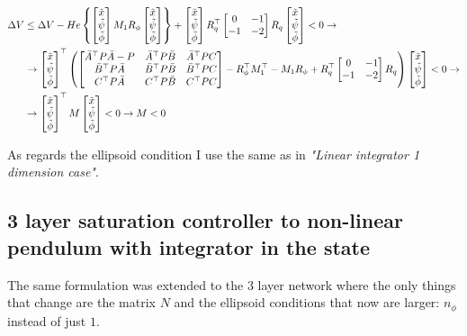 \documentclass{article}
\begin{document}
\begin{align} \label{V-condition}
  \Delta V &\leq \Delta V - He \left\{\left[\begin{matrix}
    \tilde{x} \\
    \tilde{\psi} \\
    \tilde{\phi}
  \end{matrix}\right] M_{1} R_{\phi} \left[\begin{matrix}
    \tilde{x} \\
    \tilde{\psi} \\
    \tilde{\phi}
  \end{matrix}\right]\right\} + \left[\begin{matrix}
    \tilde{x} \\
    \tilde{\psi} \\
    \tilde{\phi}
  \end{matrix}\right] R_{q}^\top \left[\begin{matrix}
    0 & -1 \\
    -1 & -2
  \end{matrix}\right] R_{q} \left[\begin{matrix}
    \tilde{x} \\
    \tilde{\psi} \\
    \tilde{\phi}
  \end{matrix}\right] < 0 \to \\
  & \to \left[\begin{matrix}
    \tilde{x} \\
    \tilde{\psi} \\
    \tilde{\phi}
  \end{matrix}\right]^\top
  \left( \left[\begin{matrix}
    \bar{A}^\top P \bar{A} - P & \bar{A}^\top P \bar{B} & \bar{A}^\top P C \\
    \bar{B}^\top P \bar{A} & \bar{B}^\top P \bar{B} & \bar{B}^\top P C \\
    C^\top P \bar{A} & C^\top P \bar{B} & C^\top P C
  \end{matrix}\right] - R_{\phi} ^\top M_{1}^\top - M_{1} R_{\phi} + R_{q}^\top \left[\begin{matrix}
    0 & -1 \\
    -1 & -2
  \end{matrix}\right] R_{q}\right)
  \left[\begin{matrix}
    \tilde{x} \\
    \tilde{\psi} \\
    \tilde{\phi}
  \end{matrix}\right] < 0 \to \\
  & \to \left[\begin{matrix}
    \tilde{x} \\
    \tilde{\psi} \\
    \tilde{\phi}
  \end{matrix}\right]^\top
  M
  \left[\begin{matrix}
    \tilde{x} \\
    \tilde{\psi} \\
    \tilde{\phi}
  \end{matrix}\right] < 0 \to M < 0 
\end{align}

As regards the ellipsoid condition I use the same as in \textit{"Linear integrator 1 dimension case"}.

\subsection*{3 layer saturation controller to non-linear pendulum with integrator in the state}

The same formulation was extended to the 3 layer network where the only things that change are the matrix $N$ and the ellipsoid conditions that now are larger: $n_{\phi}$ instead of just $1$.
\end{document}
